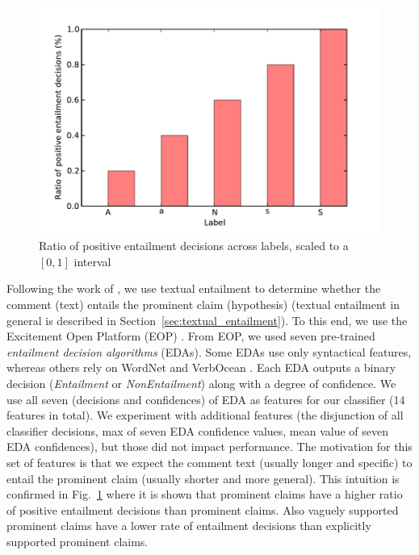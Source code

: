 \begin{figure}
\includegraphics{entailment.pdf}
\caption{Ratio of positive entailment decisions across labels, scaled to a $[0,1]$ interval
}
\label{fig:entailment_ratio}
\end{figure}

Following the work of \citet{cabrio2012combining}, we use textual 
entailment to determine whether the comment (text) entails the prominent
claim (hypothesis) (textual entailment in general is described in 
Section~\ref{sec:textual_entailment}).
To this end, we use the Excitement Open Platform (EOP) \citep{pado2015design}. 
From EOP, we used seven pre-trained \textit{entailment decision algorithms}
(EDAs). 
Some EDAs use only syntactical features, whereas others rely on
WordNet \citep{miller1995wordnet} and VerbOcean \citep{chklovski2004verbocean}. 
Each EDA outputs a binary decision (\textit{Entailment} or \textit{NonEntailment})
along with a degree of confidence. 
We use all seven (decisions and confidences) of EDA as features for our classifier 
(14 features in total). 
We experiment with additional features (the disjunction of all classifier decisions, 
max of seven EDA confidence values, mean value of seven EDA confidences), but those
did not impact performance. 
The motivation for this set of features is that we expect the comment text
(usually longer and specific) to entail the prominent claim (usually shorter
and more general).
This intuition is confirmed in Fig.~\ref{fig:entailment_ratio}
where it is shown that 
 prominent claims have a higher ratio of positive entailment decisions than
 prominent claims.
Also vaguely supported prominent claims have a lower rate of entailment
decisions than explicitly supported prominent claims. 

